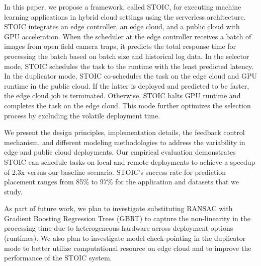 In this paper, we propose a framework, called STOIC, for executing machine learning applications in hybrid cloud settings using the serverless architecture. STOIC integrates an edge controller, an edge cloud, and a public cloud with GPU acceleration. When the scheduler at the edge controller receives a batch of images from open field camera traps, it predicts the total response time for processing the batch based on batch size and historical log data. In the selector mode, STOIC schedules the task to the runtime with the least predicted latency. In the duplicator mode, STOIC co-schedules the task on the edge cloud and GPU runtime in the public cloud. If the latter is deployed and predicted to be faster, the edge cloud job is terminated. Otherwise, STOIC halts GPU runtime and completes the task on the edge cloud. This mode further optimizes the selection process by excluding the volatile deployment time.

We present the design principles, implementation details, the feedback control mechanism, and different modeling methodologies to address the variability in edge and public cloud deployments. Our empirical evaluation demonstrates STOIC can schedule tasks on local and remote deployments to achieve a speedup of 2.3x versus our baseline scenario. STOIC's success rate for prediction placement  ranges from 85\% to 97\% for the application and datasets that we study. 

As part of future work, we plan to investigate substituting RANSAC with Gradient Boosting Regression Trees (GBRT) to capture the non-linearity in the processing time due to heterogeneous hardware across deployment options (runtimes). We also plan to investigate model check-pointing in the duplicator mode to better utilize computational resource on edge cloud and to improve the performance of the STOIC system.